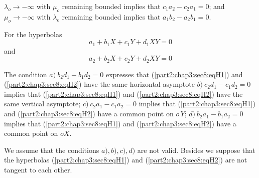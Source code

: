 $\lambda_o \to - \infty$  with $\mu_o$ remaining
    bounded implies that $c_1 a_2 - c_2 a_1 = 0$;
and $\mu_o \to - \infty$ with $\lambda_o$ 
    remaining bounded implies that  $a_1 b_2 - a_2 b_1 = 0$. 

\begin{remark*} %
  For the hyperbolas
  \begin{equation}
    a_1 + b_1 X + c_1 Y + d_1 XY = 0 \tag{$H_1$}\label{part2:chap3:sec8:eqH1}
  \end{equation}
  and 
  \begin{equation}
    a_2 + b_2 X + c_2 Y + d_2 XY = 0 \tag{$H_2$}\label{part2:chap3:sec8:eqH2}
  \end{equation}
\end{remark*}

The condition $a) ~ b_2 d_1 - b_1 d_2 = 0$ expresses that
(\ref{part2:chap3:sec8:eqH1}) and
(\ref{part2:chap3:sec8:eqH2}) have the same horizontal asymptote $b) ~c_2 d_1 - c_1 d_2 = 0$
implies that (\ref{part2:chap3:sec8:eqH1}) and (\ref{part2:chap3:sec8:eqH2})  have the same vertical asymptote;
$c) ~c_2 a_1 - c_1 a_2 = 0$ implies that (\ref{part2:chap3:sec8:eqH1})
and (\ref{part2:chap3:sec8:eqH2})  have a
common point on $o\, Y$; $d) ~b_2 a_1 - b_1 a_2 = 0$ implies that
(\ref{part2:chap3:sec8:eqH1}) and (\ref{part2:chap3:sec8:eqH2}) have a common point on $oX$. 

We assume that the conditions $a),b),c),d)$ are not valid. Besides we
suppose that the hyperbolas (\ref{part2:chap3:sec8:eqH1}) and
(\ref{part2:chap3:sec8:eqH2}) are not tangent to
each other. 

